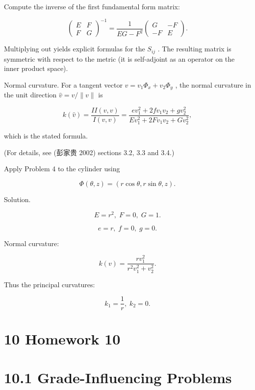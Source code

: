 \documentclass[10pt]{article}
\begin{document}
Compute the inverse of the first fundamental form matrix:

\[
{\left( \begin{array}{ll} E & F \\  F & G \end{array}\right) }^{-1} = \frac{1}{{EG} - {F}^{2}}\left( \begin{matrix} G &  - F \\   - F & E \end{matrix}\right) .
\]

Multiplying out yields explicit formulas for the \({S}_{ij}\) . The resulting matrix is symmetric with respect to the metric (it is self-adjoint as an operator on the inner product space).

Normal curvature. For a tangent vector \(v = {v}_{1}{\Phi }_{x} + {v}_{2}{\Phi }_{y}\) , the normal curvature in the unit direction \(\widehat{v} = v/\parallel v\parallel\) is

\[
k\left( \widehat{v}\right)  = \frac{{II}\left( {v,v}\right) }{I\left( {v,v}\right) } = \frac{e{v}_{1}^{2} + {2f}{v}_{1}{v}_{2} + g{v}_{2}^{2}}{E{v}_{1}^{2} + {2F}{v}_{1}{v}_{2} + G{v}_{2}^{2}},
\]

which is the stated formula.

(For details, see (彭家贵 2002) sections 3.2, 3.3 and 3.4.)

\begin{problem}[title=PROBLEM 5 (4 POINTS)]
Apply Problem 4 to the cylinder using

\[
\Phi \left( {\theta ,z}\right)  = \left( {r\cos \theta ,r\sin \theta ,z}\right) .
\]
\end{problem}

Solution.

\[
E = {r}^{2},\;F = 0,\;G = 1.
\]

\[
e = r,\;f = 0,\;g = 0.
\]

Normal curvature:

\[
k\left( v\right)  = \frac{r{v}_{1}^{2}}{{r}^{2}{v}_{1}^{2} + {v}_{2}^{2}}.
\]

Thus the principal curvatures:

\[
{k}_{1} = \frac{1}{r},\;{k}_{2} = 0.
\]

\section*{10 Homework 10}

\section*{10.1 Grade-Influencing Problems}
\end{document}
